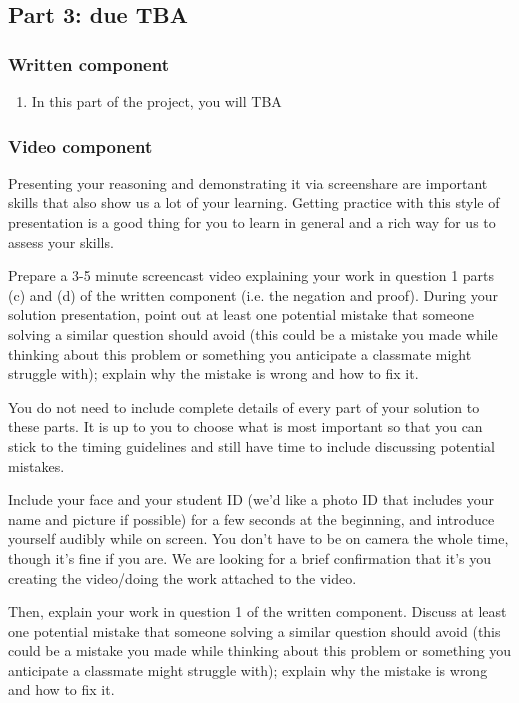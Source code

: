 \documentclass[12pt, oneside]{article}
\begin{document}
\newpage
\subsection*{Part 3: due TBA}
\subsubsection*{Written component}
\begin{enumerate}
    \item In this part of the project, you will TBA
\end{enumerate}

\subsubsection*{Video component}
Presenting your reasoning and demonstrating it via screenshare are important skills that 
also show us a lot of your learning. Getting practice with this style of presentation 
is a good thing for you to learn in general and a rich way for us to assess your skills. 

Prepare a 3-5 minute screencast video explaining your work in question 1 parts (c) and (d)
of the written component (i.e. the negation and proof).
During your solution presentation, point out at least one potential mistake that someone 
solving a similar question should avoid (this could be a mistake you made while thinking 
about this problem or something you anticipate a classmate might struggle with); 
explain why the mistake is wrong and how to fix it. 

You do not need to include complete details of every part of your solution to these parts. 
It is up to you to choose what is most important so that you can stick to the 
timing guidelines and still have time to include discussing potential mistakes.

Include your face and your student ID (we'd like a photo ID that includes your name 
and picture if possible) for a few seconds at the beginning, and introduce yourself 
audibly while on screen. You don't have to be on camera the whole time, though it's fine 
if you are. We are looking for a brief confirmation that it's you creating the 
video/doing the work attached to the video.

Then, explain your work in question 1 of the written component.
Discuss at least one potential mistake that someone solving 
a similar question should avoid (this could be a mistake you made while thinking about this 
problem or something you anticipate a classmate might struggle with); explain why the 
mistake is wrong and how to fix it.
 
\end{document}
